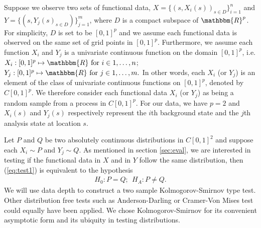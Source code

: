 \documentclass[12pt]{article}
\begin{document}
Suppose we observe two sets of functional data, $X = \{(s, X_i(s))_{s \in D}\}_{i = 1}^n$ and $Y = \{(s, Y_j(s)_{s \in D})\}_{j = 1}^m$, where $D$ is a compact subspace of $\mathbbm{R}^p$. For simplicity, $D$ is set to be $[0, 1]^p$ and we assume each functional data is observed on the same set of grid points in $[0, 1]^p$.  Furthermore, we assume each function $X_i$ and $Y_j$ is a univariate continuous function on the domain $[0, 1]^p$, i.e. 
$X_i : [0, 1]^p \mapsto \mathbbm{R} \hbox{ for } i \in 1,\ldots,n$; $Y_j : [0, 1]^p \mapsto \mathbbm{R} \hbox{ for } j \in 1,\ldots,m.$
In other words, each $X_i$ (or $Y_j$) is an element of the class of univariate continuous functions on $[0, 1]^p$, denoted by $C[0, 1]^p$. We therefore consider each functional data $X_i$ (or $Y_j$) as being a random sample from a process in $C[0, 1]^p$. For our data, we have $p = 2$ and $X_i(s)$ and $Y_j(s)$ respectively represent the $i$th background state and the $j$th analysis state at location $s$.

Let $P$ and $Q$ be two absolutely continuous distributions in $C[0,1]^2$ and suppose each $X_i \sim P$ and $Y_j \sim Q$. As mentioned in section \ref{sec:eval}, we are interested in testing if the functional data in $X$ and in $Y$ follow the same distribution, then (\ref{eq:test1}) is equivalent to the hypothesis
\begin{align}\label{eq:test2}
    H_0: P = Q;  \ \ H_A: P \neq Q.
\end{align}
We will use data depth to construct a two sample Kolmogorov-Smirnov type test. Other distribution free tests such as Anderson-Darling or Cramer-Von Mises test could equally have been applied. We chose Kolmogorov-Smirnov for its convenient asymptotic form and its ubiquity in testing distributions.
\end{document}
